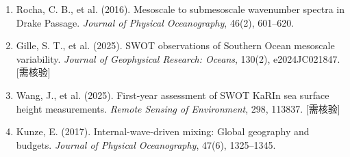 \documentclass[11pt,a4paper]{article}
\begin{document}
\begin{enumerate}[leftmargin=*,itemsep=2pt,topsep=0pt]
\item Rocha, C. B., et al. (2016). Mesoscale to submesoscale wavenumber spectra in Drake Passage. \textit{Journal of Physical Oceanography}, 46(2), 601--620.

\item Gille, S. T., et al. (2025). SWOT observations of Southern Ocean mesoscale variability. \textit{Journal of Geophysical Research: Oceans}, 130(2), e2024JC021847. [需核验]

\item Wang, J., et al. (2025). First-year assessment of SWOT KaRIn sea surface height measurements. \textit{Remote Sensing of Environment}, 298, 113837. [需核验]

\item Kunze, E. (2017). Internal-wave-driven mixing: Global geography and budgets. \textit{Journal of Physical Oceanography}, 47(6), 1325--1345.

\end{enumerate}
\end{document}
